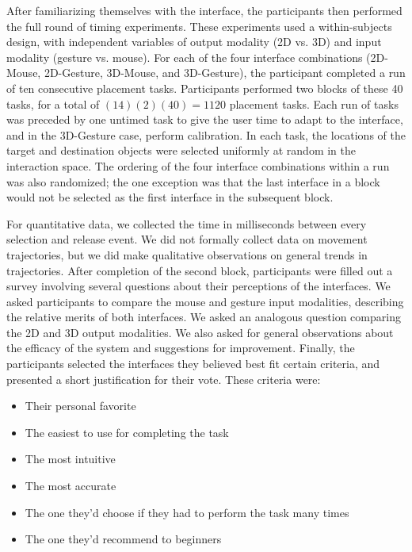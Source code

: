 \documentclass[pageno]{jpaper}
\begin{document}
After familiarizing themselves with the interface, the participants then performed the full round of timing experiments. These
experiments used a within-subjects design, with independent variables of output modality (2D vs. 3D) and input modality (gesture vs. mouse).
For each of the four interface combinations (2D-Mouse, 2D-Gesture, 3D-Mouse, and 3D-Gesture), the participant completed a
run of ten consecutive placement tasks. Participants performed two blocks of these 40 tasks, for a total of $(14)(2)(40) = 1120$
placement tasks. Each run of tasks was preceded by one untimed task to give the user time to adapt to the interface, and
in the 3D-Gesture case, perform calibration. In each task, the locations of the target and destination objects were selected uniformly at random in the interaction space. The
ordering of the four interface combinations within a run was also randomized; the one exception was that the last interface in a block
would not be selected as the first interface in the subsequent block.

For quantitative data, we collected the time in milliseconds between every selection and release event. We did not formally
collect data on movement trajectories, but we did make qualitative observations on general trends in
trajectories. After completion of the second block, participants were filled out a survey involving several questions
about their perceptions of the interfaces. We asked participants to compare the mouse and gesture input modalities, describing the relative
merits of both interfaces. We asked an analogous question comparing the 2D and 3D output modalities. We also asked for
general observations about the efficacy of the system and suggestions for improvement. Finally, the participants selected the interfaces they
believed best fit certain criteria, and presented a short justification for their vote. These criteria were:
\begin{itemize}
\item Their personal favorite
\item The easiest to use for completing the task
\item The most intuitive
\item The most accurate
\item The one they'd choose if they had to perform the task many times
\item The one they'd recommend to beginners
\end{itemize}
\end{document}
